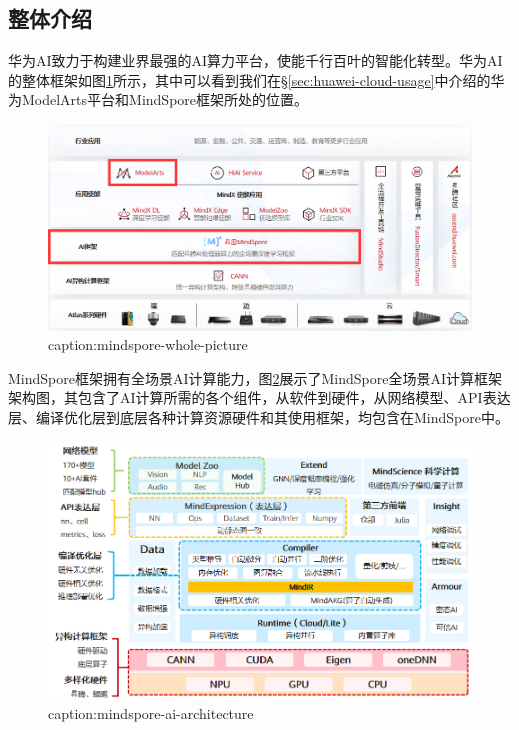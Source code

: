 \subsection{整体介绍}

华为AI致力于构建业界最强的AI算力平台，使能千行百叶的智能化转型。华为AI的整体框架如图\ref{fig:mindspore-whole-picture}所示，其中可以看到我们在\S\ref{sec:huawei-cloud-usage}中介绍的华为ModelArts平台和MindSpore框架所处的位置。
\begin{figure}[htbp]
	\centering
	\includegraphics[width=1\textwidth]{figures/mindspore-whole-picture.png}
	\caption{caption:mindspore-whole-picture}
	\label{fig:mindspore-whole-picture}
\end{figure}

MindSpore框架拥有全场景AI计算能力，图\ref{fig:mindspore-ai-architecture}展示了MindSpore全场景AI计算框架架构图，其包含了AI计算所需的各个组件，从软件到硬件，从网络模型、API表达层、编译优化层到底层各种计算资源硬件和其使用框架，均包含在MindSpore中。

\begin{figure}[htbp]
	\centering
	\includegraphics[width=1\textwidth]{figures/mindspore-ai-architecture.png}
	\caption{caption:mindspore-ai-architecture}
	\label{fig:mindspore-ai-architecture}
\end{figure}


